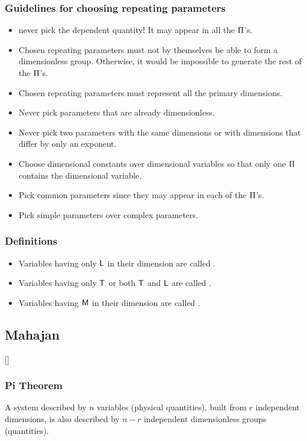 \subsubsection{Guidelines for choosing repeating parameters}
\begin{itemize}
%
\item never pick the dependent quantity! It may appear in all the $\Pi$'s.
%
\item Chosen repeating parameters must not by themselves be able to form a dimensionless group. Otherwise, it would be impossible to generate the rest of the $\Pi$'s.
%
\item Chosen repeating parameters must represent all the primary dimensions.
%
\item Never pick parameters that are already dimensionless.
%
\item Never pick two parameters with the same dimensions or with dimensions that differ by only an exponent.
%
\item Choose dimensional constants over dimensional variables so that only one $\Pi$ contains the dimensional variable.
%
\item Pick common parameters since they may appear in each of the $\Pi$'s.
%
\item Pick simple parameters over complex parameters.
%
\end{itemize}


\subsubsection{Definitions}
\begin{itemize}
%
\item Variables having only $\mathsf{L}$ in their dimension are called .
%
\item Variables having only $\mathsf{T}$ or both $\mathsf{T}$ and $\mathsf{L}$ are called .
%
\item Variables having $\mathsf{M}$ in their dimension are called .
%
\end{itemize}


\subsection{Mahajan}
[\citep{sanjoy:1998}]

\subsubsection{Pi Theorem}
A system described by $n$ variables (physical quantities), built from $r$ independent dimensions, is also described by $n - r$ independent dimensionless groups (quantities).
